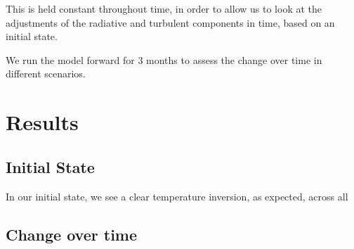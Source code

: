 \documentclass[12]{article}
\begin{document}
This is held constant throughout time, in order to allow us to look at the adjustments of the radiative and turbulent components in time, based on an initial state. 

We run the model forward for 3 months to assess the change over time in different  scenarios.

\section{Results}
\subsection{Initial State}
In our initial state, we see a clear temperature inversion, as expected, across all 

\subsection{Change over time}


\pagebreak


\end{document}
